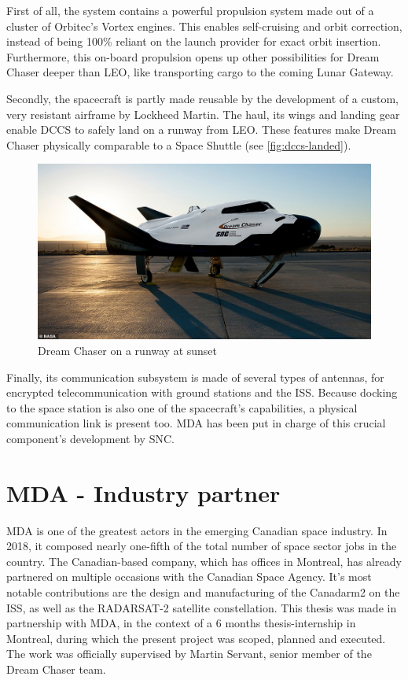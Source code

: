 First of all, the system contains a powerful propulsion system made out of a cluster of Orbitec's Vortex engines\cite{online:messier}. This enables self-cruising and orbit correction, instead of being 100\% reliant on the launch provider for exact orbit insertion. Furthermore, this on-board propulsion opens up other possibilities for Dream Chaser deeper than \gls{LEO}, like transporting cargo to the coming Lunar Gateway\cite{online:foust}.

Secondly, the  spacecraft is partly made reusable by the development of a custom, very resistant airframe by Lockheed Martin. The haul, its wings and landing gear enable \gls{DCCS} to safely land on a runway from \gls{LEO}. These features make Dream Chaser physically comparable to a Space Shuttle (see \autoref{fig:dccs-landed}). 
\begin{figure}[H]
	\vspace{12pt}
	\centering
	\includegraphics[width=0.9\linewidth, keepaspectratio]{art/dream-chaser-landed.jpg}
	\caption{Dream Chaser on a runway at sunset \cite{misc:dccs-landed}}
	\label{fig:dccs-landed}
\end{figure}
Finally, its communication subsystem is made of several types of antennas, for encrypted telecommunication with ground stations and the \gls{ISS}. Because docking to the space station is also one of the spacecraft's capabilities, a physical communication link is present too. \gls{MDA} has been put in charge of this crucial component's development by \gls{SNC}. 

\section{MDA - Industry partner}
\gls{MDA} is one of the greatest actors in the emerging Canadian space industry. In 2018, it composed nearly one-fifth of the total number of space sector jobs in the country\cite{online:mda-front-page}\cite{misc:canada-space-industry-report}. The Canadian-based company, which has offices in Montreal, has already partnered on multiple occasions with the Canadian Space Agency. It's most notable contributions are the design and manufacturing of the Canadarm2 on the \gls{ISS}, as well as the RADARSAT-2 satellite constellation. This thesis was made in partnership with \gls{MDA}, in the context of a 6 months thesis-internship in Montreal, during which the present project was scoped, planned and executed. The work was officially supervised by Martin Servant, senior member of the Dream Chaser team. 

